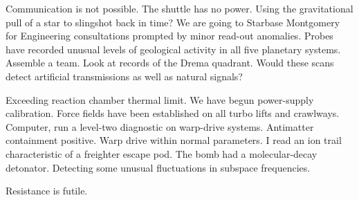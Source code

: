 Communication is not possible. The shuttle has no power. Using the gravitational pull of a star to slingshot back in time? We are going to Starbase Montgomery for Engineering consultations prompted by minor read-out anomalies. Probes have recorded unusual levels of geological activity in all five planetary systems. Assemble a team. Look at records of the Drema quadrant. Would these scans detect artificial transmissions as well as natural signals?

Exceeding reaction chamber thermal limit. We have begun power-supply calibration. Force fields have been established on all turbo lifts and crawlways. Computer, run a level-two diagnostic on warp-drive systems. Antimatter containment positive. Warp drive within normal parameters. I read an ion trail characteristic of a freighter escape pod. The bomb had a molecular-decay detonator. Detecting some unusual fluctuations in subspace frequencies.

Resistance is futile.